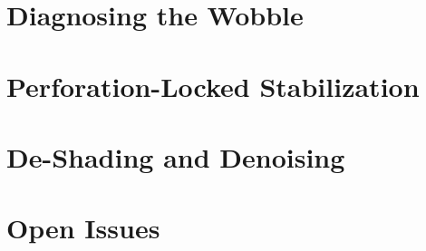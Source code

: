\section{Diagnosing the Wobble}
\label{sec:fw-wobble}

\section{Perforation-Locked Stabilization}
\label{sec:fw-perflock}

\section{De-Shading and Denoising}
\label{sec:fw-postprocessing}

\section{Open Issues}
\label{sec:fw-open}
